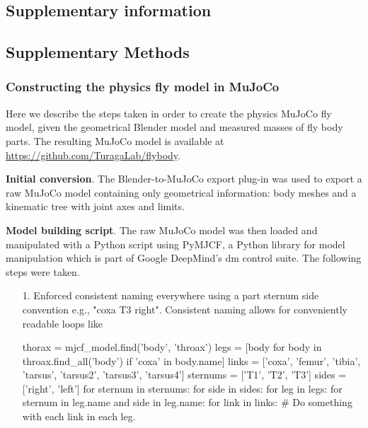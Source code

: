 \documentclass[sn-mathphys-num]{sn-jnl}%
\theoremstyle{thmstyleone}%
\theoremstyle{thmstyletwo}%
\theoremstyle{thmstylethree}%
\begin{document}
\begin{appendices}
	
	
\section{Supplementary information} \label{secInfo}

\subsection{Supplementary Methods}

\subsubsection{Constructing the physics fly model in MuJoCo}

Here we describe the steps taken in order to create the physics MuJoCo fly model, given the geometrical Blender model and measured masses of fly body parts. 
The resulting MuJoCo model is available at \href{https://github.com/TuragaLab/flybody}{https://github.com/TuragaLab/flybody}.


\textbf{Initial conversion}. The Blender-to-MuJoCo export plug-in\cite{tunyasuvunakool2020dm_control} was used to export a raw MuJoCo model containing only geometrical information: 
body meshes and a kinematic tree with joint axes and limits.


\textbf{Model building script}. 
The raw MuJoCo model was then loaded and manipulated with a Python script using PyMJCF, a Python library for model manipulation which is part of Google DeepMind's dm control suite\cite{tunyasuvunakool2020dm_control}. 
The following steps were taken.



\begin{itemize}
	\item[1.] 
	Enforced consistent naming everywhere using a part sternum side convention e.g., "coxa T3 right". 
	Consistent naming allows for conveniently readable loops like
	\begin{python}
	thorax = mjcf_model.find('body', 'throax')
	legs = [body for body in throax.find_all('body') if 'coxa' in body.name]
	links = ['coxa', 'femur', 'tibia', 'tarsus', 'tarsus2', 'tarsus3', 'tarsus4']
	sternums = ['T1', 'T2', 'T3']
	sides = ['right', 'left']
	for sternum in sternums:
 	  for side in sides:
  	    for leg in legs:
    	  for sternum in leg.name and side in leg.name:
	      	for link in links:
	      	# Do something with each link in each leg.
	\end{python}


\end{itemize}
\end{appendices}
\end{document}
